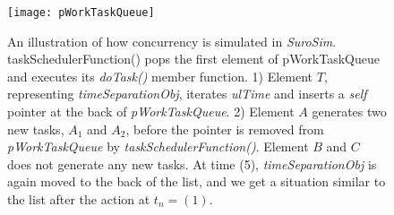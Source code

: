 \begin{figure}[htb!p]
	\centering
	\texttt{[image: pWorkTaskQueue]}
	\caption[A schematic model of time propagation in \emph{auroSim}]{
			An illustration of how concurrency is simulated in \emph{SuroSim}.
			taskSchedulerFunction() pops the first element of pWorkTaskQueue and executes its \emph{doTask()} member function.
			1) Element $T$, representing \emph{timeSeparationObj}, iterates \emph{ulTime} and inserts a \emph{self} pointer at the back of \emph{pWorkTaskQueue}.
			2) Element $A$ generates two new tasks, $A_1$ and $A_2$, before the pointer is removed from \emph{pWorkTaskQueue} by \emph{taskSchedulerFunction()}.
			Element $B$ and $C$ does not generate any new tasks.
			At time (5), \emph{timeSeparationObj} is again moved to the back of the list, and we get a situation similar to the list after the action at $t_n=(1)$. 
			}
	\label{figTimePropagationbypWorkTaskQueue}
\end{figure}


